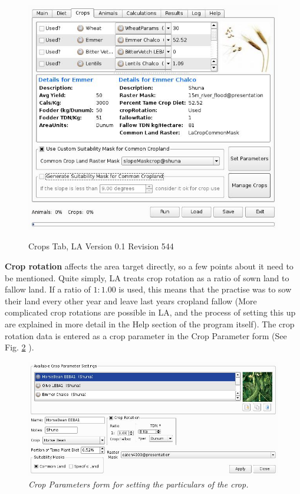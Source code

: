     \begin{figure}[htbp]
        \includegraphics[scale=.366]{./images/LanduseAnalystCrops546.jpg}
      \label{fig:crop} \caption{Crops Tab, LA Version 0.1 Revision 544}
    \end{figure}
    
  \textbf{Crop rotation} affects the area target
  directly, so a few points about it need to be mentioned.  Quite simply, LA
  treats crop rotation as a ratio of sown land to fallow land.  If a ratio of
  $1:1.00$ is used, this means that the practise was to sow their land every
  other year and leave last years cropland fallow (More complicated crop
  rotations are possible in LA, and the process of setting this up are
  explained in more detail in the Help section of the program itself).  The
  crop rotation data is entered as a crop parameter in the Crop Parameter form
  (See Fig. \ref{fig:cropParameters} ).
    \begin{figure}[htbp] %
        \includegraphics[scale=.28]{./images/cropParameters.jpg}
      \caption[Crop Parameters]{\label{fig:cropParameters}\textit{Crop
Parameters form for setting the particulars of the crop.}}
    \end{figure}


